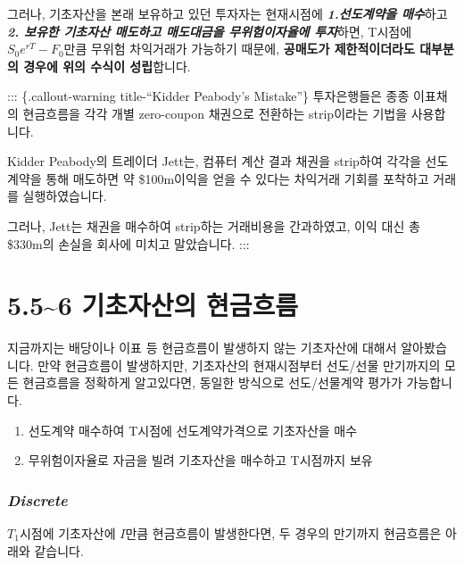 \documentclass[
  letterpaper,
  DIV=11,
  numbers=noendperiod]{scrreprt}
\providecommand{\tightlist}{%
  \setlength{\itemsep}{0pt}\setlength{\parskip}{0pt}}\usepackage{longtable,booktabs,array}
\begin{document}
그러나, 기초자산을 본래 보유하고 있던 투자자는 현재시점에
\textbf{\emph{1.선도계약을 매수}}하고 \textbf{\emph{2. 보유한 기초자산
매도하고 매도대금을 무위험이자율에 투자}}하면, T시점에
\(S_0e^{rT}-F_0\)만큼 무위험 차익거래가 가능하기 때문에,
\textbf{공매도가 제한적이더라도 대부분의 경우에 위의 수식이 성립}합니다.

::: \{.callout-warning title-``Kidder Peabody's Mistake''\} 투자은행들은
종종 이표채의 현금흐름을 각각 개별 zero-coupon 채권으로 전환하는
strip이라는 기법을 사용합니다.

Kidder Peabody의 트레이더 Jett는, 컴퓨터 계산 결과 채권을 strip하여
각각을 선도계약을 통해 매도하면 약 \$100m이익을 얻을 수 있다는 차익거래
기회를 포착하고 거래를 실행하였습니다.

그러나, Jett는 채권을 매수하여 strip하는 거래비용을 간과하였고, 이익
대신 총 \$330m의 손실을 회사에 미치고 말았습니다. :::

\section*{5.5\textasciitilde6 기초자산의
현금흐름}\label{uxae30uxcd08uxc790uxc0b0uxc758-uxd604uxae08uxd750uxb984}


지금까지는 배당이나 이표 등 현금흐름이 발생하지 않는 기초자산에 대해서
알아봤습니다. 만약 현금흐름이 발생하지만, 기초자산의 현재시점부터
선도/선물 만기까지의 모든 현금흐름을 정확하게 알고있다면, 동일한
방식으로 선도/선물계약 평가가 가능합니다.

\begin{enumerate}
\def\labelenumi{\arabic{enumi}.}
\tightlist
\item
  선도계약 매수하여 T시점에 선도계약가격으로 기초자산을 매수
\item
  무위험이자율로 자금을 빌려 기초자산을 매수하고 T시점까지 보유
\end{enumerate}

\subsubsection*{\texorpdfstring{\textbf{\emph{Discrete}}}{Discrete}}\label{sec-5.6dis}

\(T_1\)시점에 기초자산에 \(I\)만큼 현금흐름이 발생한다면, 두 경우의
만기까지 현금흐름은 아래와 같습니다.
\end{document}
